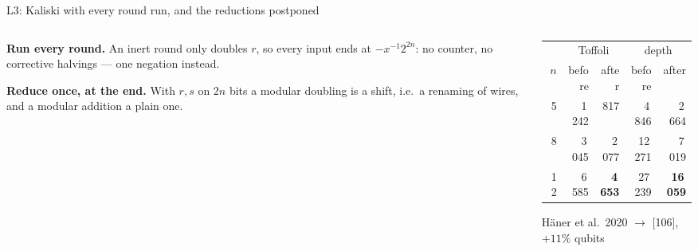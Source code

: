 \documentclass[aspectratio=169,11pt]{beamer}
\newcommand{\code}[2][]{}
\begin{document}
\begin{frame}[fragile]{L3: Kaliski with every round run, and the reductions postponed}
  \begin{columns}[T]
    \begin{column}{0.54\textwidth}
      \small
      \textbf{Run every round.} An inert round only doubles $r$, so every input ends at $-x^{-1}2^{2n}$: no counter, no corrective halvings --- one negation instead.\par\vskip1mm
      \textbf{Reduce once, at the end.} With $r,s$ on $2n$ bits a modular doubling is a shift, i.e.\ a renaming of wires, and a modular addition a plain one.
    \end{column}
    \begin{column}{0.42\textwidth}
      \centering\footnotesize
      \renewcommand{\arraystretch}{1.08}
      \begin{tabular}{@{}rrrrr@{}}
        \toprule
        & \multicolumn{2}{c}{Toffoli} & \multicolumn{2}{c}{depth} \\
        $n$ & before & after & before & after \\
        \midrule
        5 & 1\,242 & 817 & 4\,846 & 2\,664 \\
        8 & 3\,045 & 2\,077 & 12\,271 & 7\,019 \\
        12 & 6\,585 & \textbf{4\,653} & 27\,239 & \textbf{16\,059} \\
        \bottomrule
      \end{tabular}\par
      {\scriptsize Häner et al.\ 2020 $\to$ [106], $+11\%$ qubits}
    \end{column}
  \end{columns}
  \code[basicstyle=\ttfamily\scriptsize]{kaliski_opt.py}
\end{frame}
\end{document}
